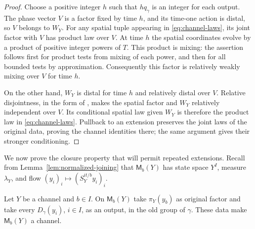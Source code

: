 \begin{proof}
Choose a positive integer $h$ such that $hq_\gamma$ is an integer for
each output.  The phase vector $V$ is a factor fixed by time $h$, and
its time-one action is distal, so $V$ belongs to $W_Y$.  For any spatial
tuple appearing in \eqref{eq:channel-laws}, its joint factor with $V$
has product law over $V$.  At time $h$ the spatial coordinates evolve
by a product of positive integer powers of $T$.  This product is mixing:
the assertion follows first for product tests from mixing of each
power, and then for all bounded tests by approximation.  Consequently
this factor is relatively weakly mixing over $V$ for time $h$.

On the other hand, $W_Y$ is distal for time $h$ and relatively distal
over $V$.  Relative disjointness, in the form of
\cite[Proposition~2.2]{FourfoldCompanion}, makes the spatial factor and
$W_Y$ relatively independent over $V$.  Its conditional spatial law
given $W_Y$ is therefore the product law in
\eqref{eq:channel-laws}.  Pullback to an extension preserves the joint
laws of the original data, proving the channel identities there; the
same argument gives their stronger conditioning.
\end{proof}

We now prove the closure property that will permit repeated extensions.
Recall from Lemma~\ref{lem:normalized-joining} that
$\mathsf M_b(Y)$ has state space $Y^I$, measure $\lambda_Y$, and flow
$(y_i)_i\mapsto(S_Y^{it/b}y_i)_i$.

\begin{proposition}\label{prop:channel-closure}
Let $Y$ be a channel and $b\in I$.  On $\mathsf M_b(Y)$ take
$\pi_Y(y_b)$ as original factor and take every $D_\gamma(y_i)$,
$i\in I$, as an output, in the old group of $\gamma$.
These data make $\mathsf M_b(Y)$ a channel.
\end{proposition}

